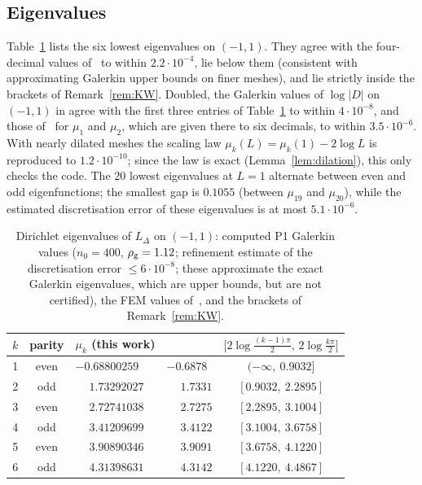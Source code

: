 \documentclass[11pt]{amsart}
\newcommand{\LD}{L_\Delta}
\newcommand{\e}[1]{\cdot 10^{#1}}
\theoremstyle{definition}
\theoremstyle{remark}
\numberwithin{equation}{section}
\begin{document}
\subsection*{Eigenvalues}
Table~\ref{tab:eig} lists the six lowest eigenvalues on $(-1,1)$. They agree with the four-decimal values of~\cite{HJSS25} to within $2.2\e{-4}$, lie below them (consistent with approximating Galerkin upper bounds on finer meshes), and lie strictly inside the brackets of Remark~\ref{rem:KW}. Doubled, the Galerkin values of $\log|D|$ on $(-1,1)$ in \cite[\S10]{BT26} agree with the first three entries of Table~\ref{tab:eig} to within $4\e{-8}$, and those of~\cite{Ve26} for $\mu_1$ and $\mu_2$, which are given there to six decimals, to within $3.5\e{-6}$. With nearly dilated meshes the scaling law $\mu_k(L)=\mu_k(1)-2\log L$ is reproduced to $1.2\e{-10}$; since the law is exact (Lemma~\ref{lem:dilation}), this only checks the code. The $20$ lowest eigenvalues at $L=1$ alternate between even and odd eigenfunctions; the smallest gap is $0.1055$ (between $\mu_{19}$ and $\mu_{20}$), while the estimated discretisation error of these eigenvalues is at most $5.1\e{-6}$.

\begin{table}[ht]
\centering\small
\caption{Dirichlet eigenvalues of $\LD$ on $(-1,1)$: computed P1 Galerkin values ($n_0=400$, $\rho_{\rm g}=1.12$; refinement estimate of the discretisation error $\le6\e{-8}$; these approximate the exact Galerkin eigenvalues, which are upper bounds, but are not certified), the FEM values of~\cite{HJSS25}, and the brackets of Remark~\ref{rem:KW}.}\label{tab:eig}
\begin{tabular}{rcllc}
\toprule
$k$ & parity & $\mu_k$ (this work) & \cite{HJSS25} & $\bigl[2\log\frac{(k-1)\pi}2,\,2\log\frac{k\pi}2\bigr]$\\
\midrule
1 & even & $-0.68800259$ & $-0.6878$ & $(-\infty,\ 0.9032]$\\
2 & odd  & $\phantom{-}1.73292027$ & $\phantom{-}1.7331$ & $[0.9032,\ 2.2895]$\\
3 & even & $\phantom{-}2.72741038$ & $\phantom{-}2.7275$ & $[2.2895,\ 3.1004]$\\
4 & odd  & $\phantom{-}3.41209699$ & $\phantom{-}3.4122$ & $[3.1004,\ 3.6758]$\\
5 & even & $\phantom{-}3.90890346$ & $\phantom{-}3.9091$ & $[3.6758,\ 4.1220]$\\
6 & odd  & $\phantom{-}4.31398631$ & $\phantom{-}4.3142$ & $[4.1220,\ 4.4867]$\\
\bottomrule
\end{tabular}
\end{table}
\end{document}
